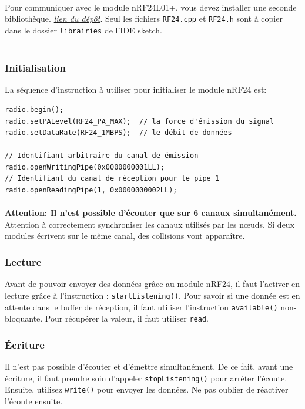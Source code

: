 \documentclass[a4paper, titlepage, oneside, 12pt]{article}%
\begin{document}
\paragraph{}
Pour communiquer avec le module nRF24L01+, vous devez installer une seconde bibliothèque.
\href{https://github.com/stanleyseow/RF24}{\textit{lien du dépôt}}. Seul les fichiers \texttt{RF24.cpp} et \texttt{RF24.h} sont à copier dans le dossier \texttt{librairies} de l'IDE sketch.
\\ \\
\subsubsection{Initialisation}
La séquence d'instruction à utiliser pour initialiser le module nRF24 est:\\

\begin{lstlisting}
radio.begin();
radio.setPALevel(RF24_PA_MAX);	// la force d'émission du signal
radio.setDataRate(RF24_1MBPS);	// le débit de données

// Identifiant arbitraire du canal de émission 
radio.openWritingPipe(0x0000000001LL);
// Identifiant du canal de réception pour le pipe 1
radio.openReadingPipe(1, 0x0000000002LL);
\end{lstlisting}
\paragraph{}
\textbf{Attention: Il n'est possible d’écouter que sur 6 canaux simultanément.\\}
Attention à correctement synchroniser les canaux utilisés par les nœuds. Si deux modules écrivent sur le même canal, des collisions vont apparaître.

\subsubsection{Lecture}
Avant de pouvoir envoyer des données grâce au module nRF24, il faut l'activer en lecture grâce à l'instruction : \texttt{startListening()}.
Pour savoir si une donnée est en attente dans le buffer de réception, il faut utiliser l'instruction \texttt{available()} non-bloquante.
Pour récupérer la valeur, il faut utiliser \texttt{read}.

\subsubsection{Écriture}
Il n'est pas possible d'écouter et d'émettre simultanément. De ce fait, avant une écriture, il faut prendre soin d'appeler \texttt{stopListening()} pour arrêter l'écoute. Ensuite, utilisez \texttt{write()} pour envoyer les données.
Ne pas oublier de réactiver l'écoute ensuite.
\end{document}
